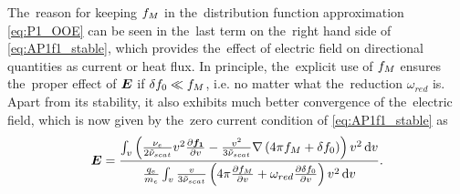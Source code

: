 The~reason for keeping $f_M$ in the~distribution function approximation
\eqref{eq:P1_OOE} can be seen in the~last term on the~right hand side of 
\eqref{eq:AP1f1_stable}, which provides the~effect of electric field on
directional quantities as current or heat flux. In principle, the~explicit use
of $f_M$ ensures the~proper effect of $\boldsymbol{E}$ if $\delta f_0 \ll f_M$, i.e.
no matter what the~reduction $\omega_{red}$ is. Apart from its stability,
it also exhibits much better convergence of the~electric field, which is now
given by the~zero current condition of \eqref{eq:AP1f1_stable} as
\begin{equation}
  \boldsymbol{E} =
  \frac{\int_{v} \left(\frac{\nu_{e}}{2\tilde{\nu}_{scat}}v^2\frac{\partial{\boldsymbol{f_1}}}{\partial{v}}
  - \frac{v^2}{3\tilde{\nu}_{scat}}
  \nabla\left(4\pi f_M + \delta f_0\right)\right) v^2\, \text{d}v}
  {\frac{q_e}{m_e}\int_{v} \frac{v}
  {3\tilde{\nu}_{scat}}
  \left(4\pi\frac{\partial{f_M}}{\partial{v}} + \omega_{red} \frac{\partial{\delta f_0}}{\partial{v}}\right)
  v^2\, \text{d}v} .
  \label{eq:AP1_Efield_stable}
\end{equation}

\begin{comment} %
\section{Calder kinetics}
\label{app:CalderKinetics}
and is written (it would be better to write Eq. (2) in its conservative forme and its non relativistic kernel U):
\begin{widetext}
\begin{eqnarray}
&&\frac{\partial f_\alpha}{\partial t}+\mathbf{v}\cdot\nabla_{\mathbf{x}}f_\alpha+q_\alpha\left(\mathbf{E}+\mathbf{v}\vect{\times}\mathbf{B}\right)\nabla_{\mathbf{p}}f_\alpha=C_{LBB}(f_\alpha,f_\alpha)+\sum_\beta C_{LBB}(f_\alpha,f_\beta),\\
&&C_{LBB}(f_\alpha,f_\beta)=-\frac{\partial}{\partial \mathbf{p}}\cdot\frac{\Gamma_{\alpha\beta}}{2}\left[\int \mathbf{U}(\mathbf{p},\mathbf{p}^\prime)\cdot(f_\alpha\nabla_{\mathbf{p}^\prime}f_\beta^\prime-f_\beta^\prime\nabla_{\mathbf{p}}f_\alpha)\right]d^3\mathbf{p}^\prime,\\
&&\mathbf{U}(\mathbf{p},\mathbf{p}^\prime)=\frac{r^2/\gamma\gamma^\prime}{(r^2-1)^{3/2}}\left[(r^2-1)\mathbf{I}-\mathbf{p}\otimes\mathbf{p}-\mathbf{p}^\prime\otimes\mathbf{p}^\prime+r(\mathbf{p}\otimes\mathbf{p}^\prime+\mathbf{p}^\prime\otimes\mathbf{p})\right],
\end{eqnarray}
\end{widetext}
with $\gamma=\sqrt{1+\mathbf{p}^2}$, $\gamma^\prime=\sqrt{1+\mathbf{p}^{\prime 2}}$ and $r=\gamma\gamma^\prime-\mathbf{p}\cdot\mathbf{p}^\prime$. The momemtum $\mathbf{p}_\alpha$ ($\mathbf{p}_\beta$) is normalized to $m_\alpha c$ (resp. $m_\beta c$). Obviously, this collision operator tends to Eq. (2) in the non-relativistic limit.
\end{comment} %

